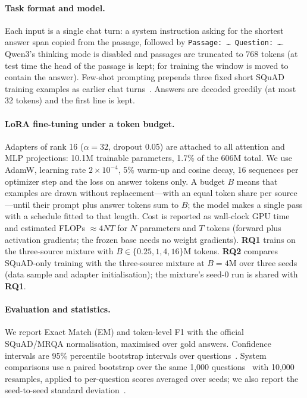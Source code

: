 \documentclass{article}
\newcommand{\RQ}[1]{\textbf{RQ#1}}
\begin{document}
\paragraph{Task format and model.} Each input is a single chat turn: a system instruction asking for
the shortest answer span copied from the passage, followed by \texttt{Passage: \dots\ Question: \dots}.
Qwen3's thinking mode is disabled and passages are truncated to 768 tokens (at test time the head of
the passage is kept; for training the window is moved to contain the answer). Few-shot prompting
prepends three fixed short SQuAD training examples as earlier chat turns~\citep{brown2020gpt3}. Answers
are decoded greedily (at most 32 tokens) and the first line is kept.

\paragraph{LoRA fine-tuning under a token budget.} Adapters of rank 16 ($\alpha{=}32$, dropout 0.05)
are attached to all attention and MLP projections: 10.1M trainable parameters, 1.7\% of the 606M total.
We use AdamW, learning rate $2{\times}10^{-4}$, 5\% warm-up and cosine decay, 16 sequences per
optimizer step and the loss on answer tokens only. A budget $B$ means that examples are drawn without
replacement---with an equal token share per source---until their prompt plus answer tokens sum to $B$;
the model makes a single pass with a schedule fitted to that length. Cost is reported as wall-clock GPU
time and estimated FLOPs $\approx 4NT$ for $N$ parameters and $T$ tokens (forward plus activation
gradients; the frozen base needs no weight gradients). \RQ{1} trains on the three-source mixture with
$B \in \{0.25, 1, 4, 16\}$M tokens. \RQ{2} compares SQuAD-only training with the three-source mixture
at $B{=}4$M over three seeds (data sample and adapter initialisation); the mixture's seed-0 run is shared
with \RQ{1}.

\paragraph{Evaluation and statistics.} We report Exact Match (EM) and token-level F1 with the official
SQuAD/MRQA normalisation, maximised over gold answers. Confidence intervals are 95\% percentile
bootstrap intervals over questions~\citep{efron1993bootstrap}. System comparisons use a paired bootstrap
over the same 1,000 questions~\citep{koehn2004bootstrap} with 10,000 resamples, applied to per-question
scores averaged over seeds; we also report the seed-to-seed standard deviation~\citep{dodge2020finetuning}.
\end{document}
